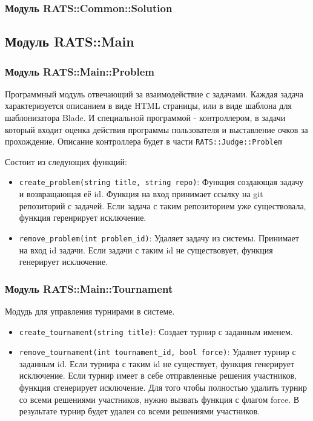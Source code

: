 \documentclass[a4paper,12pt]{article}
\begin{document}
\subsubsection{Модуль RATS::Common::Solution}

\subsection{Модуль RATS::Main}
\subsubsection{Модуль RATS::Main::Problem}
Программный модуль отвечающий за взаимодействие с задачами.
Каждая задача характеризуется описанием в виде HTML страницы, или в виде шаблона для шаблонизатора Blade.
И специальной программой - контроллером, в задачи который входит оценка действия программы пользователя и выставление очков за прохождение. Описание контроллера будет в части \verb+RATS::Judge::Problem+

Состоит из следующих функций: 

\begin{itemize}
    \item \verb+create_problem(string title, string repo)+: Функция создающая задачу и возвращающая её id. Функция на вход принимает ссылку на git репозиторий с задачей. Если задача с таким репозиторием уже существовала, функция геренрирует исключение.
    \item \verb+remove_problem(int problem_id)+: Удаляет задачу из системы. Принимает на вход id задачи. Если задачи с таким id не существовует, функция генерирует исключение.
\end{itemize}

\subsubsection{Модуль RATS::Main::Tournament}
Модудь для управления турнирами в системе. 

\begin{itemize}
    \item \verb+create_tournament(string title)+: Создает турнир с заданным именем.
    \item \verb+remove_tournament(int tournament_id, bool force)+:  Удаляет турнир с заданным id. Если турнира с таким id не существует, функция генерирует исключение. Если турнир имеет в себе отправленные решения участников, функция сгенерирует исключение. Для того чтобы полностью удалить турнир со всеми решениями участников, нужно вызвать функция с флагом force. В результате турнир будет удален со всеми решениями участников.
\end{itemize}
\end{document}
